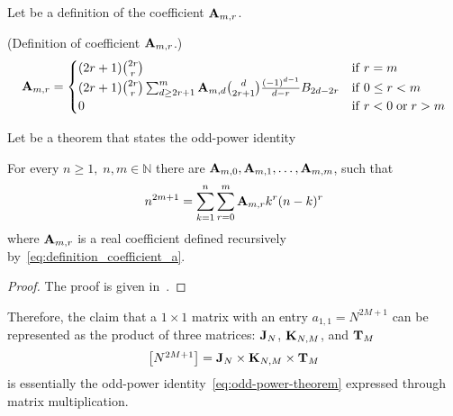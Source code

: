 Let be a definition of the coefficient ${\mathbf{A}} \sb{m,r}$.
\begin{definition} (Definition of coefficient ${\mathbf{A}} \sb{m,r}$.)
    \begin{equation}
        \label{eq:definition_coefficient_a}
        {\mathbf{A}} \sb{m,r} =
        \begin{cases}
        (2r+1)
            \binom{2r}{r} & \mathrm{if} \; r=m \\
            (2r+1) \binom{2r}{r} \sum_{d \geq 2r+1}^{m} {\mathbf{A}} \sb{m,d} \binom{d}{2r+1} \frac{(-1)^{d-1}}{d-r}
            {B}\sb{2d-2r} & \mathrm{if} \; 0 \leq r<m \\
            0 & \mathrm{if} \; r<0 \; \mathrm{or} \; r>m
        \end{cases}
    \end{equation}
\end{definition}
Let be a theorem that states the odd-power identity
\begin{theorem}
    For every $n\geq 1, \; n,m\in\mathbb{N}$ there are ${\mathbf{A}} \sb{m,0}, {\mathbf{A}} \sb{m,1},\dots,{\mathbf{A}} \sb{m,m}$,
    such that
    \begin{equation*}
        n^{2m+1} = \sum_{k=1}^{n}\sum_{r=0}^{m} {\mathbf{A}} \sb{m,r} k^r (n-k)^r
        \label{eq:odd-power-theorem}
    \end{equation*}
    where ${\mathbf{A}} \sb{m,r}$ is a real coefficient defined recursively by~\eqref{eq:definition_coefficient_a}.
    \begin{proof}
        The proof is given in~\cite{kolosov2016link, kolosov2022106}.
    \end{proof}
\end{theorem}
Therefore, the claim that a \(1 \times 1\) matrix with an entry \(a_{1,1} = N^{2M+1}\)
can be represented as the product of three matrices: \({\mathbf{J}} \sb{N}\),
\({\mathbf{K}} \sb{N, M}\), and \({\mathbf{T}} \sb{M}\)
\[
    \begin{bmatrix}
        N^{2M+1}
    \end{bmatrix} = {\mathbf{J}} \sb{N} \times {\mathbf{K}} \sb{N, M} \times {\mathbf{T}} \sb{M}
\]
is essentially the odd-power identity~\eqref{eq:odd-power-theorem} expressed through matrix multiplication.
